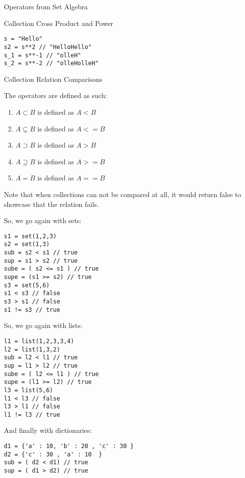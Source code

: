 \begin{section}{Operators from Set Algebra}
\begin{subsection}{Collection Cross Product and Power}
\begin{lstlisting}[style=JexlStyle]
s = "Hello"
s2 = s**2 // "HelloHello"
s_1 = s**-1 // "olleH"
s_2 = s**-2 // "olleHolleH"
\end{lstlisting}
\end{subsection}

\begin{subsection}{Collection Relation Comparisons}

The operators are defined as such:
\begin{enumerate}
\item{ $A \subset B $ is defined as $A < B $  }
\item{ $A \subseteq B $ is defined as $A <= B $  }
\item{ $A \supset B $ is defined as $A > B $  }
\item{ $A \supseteq B $ is defined as $A >= B $  }
\item{ $A = B$ is defined as $A == B$  }
\end{enumerate}

Note that when collections can not be compared at all, 
it would return false to showcase that the relation fails.

So, we go again with sets:

\begin{center}\begin{minipage}{\linewidth}
\begin{lstlisting}[style=JexlStyle]
s1 = set(1,2,3)
s2 = set(1,3)
sub = s2 < s1 // true  
sup = s1 > s2 // true 
sube = ( s2 <= s1 ) // true  
supe = (s1 >= s2) // true 
s3 = set(5,6)
s1 < s3 // false 
s3 > s1 // false 
s1 != s3 // true
\end{lstlisting}
\end{minipage}\end{center}

So, we go again with lists:

\begin{lstlisting}[style=JexlStyle]
l1 = list(1,2,3,3,4)
l2 = list(1,3,2)
sub = l2 < l1 // true  
sup = l1 > l2 // true 
sube = ( l2 <= l1 ) // true  
supe = (l1 >= l2) // true 
l3 = list(5,6)
l1 < l3 // false 
l3 > l1 // false 
l1 != l3 // true
\end{lstlisting}

And finally with dictionaries:

\begin{lstlisting}[style=JexlStyle]
d1 = {'a' : 10, 'b' : 20 , 'c' : 30 }
d2 = {'c' : 30 , 'a' : 10  }
sub = ( d2 < d1) // true 
sup = ( d1 > d2) // true
\end{lstlisting}
\end{subsection}


\end{section}
